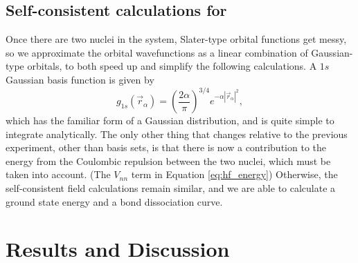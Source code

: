 \documentclass[journal=jacsat,manuscript=communication]{achemso}
\begin{document}
\subsection{Self-consistent calculations for }
Once there are two nuclei in the system, Slater-type orbital functions get messy, so we approximate the orbital wavefunctions as a linear combination of Gaussian-type orbitals, to both speed up and simplify the following calculations.  A $1s$ Gaussian basis function is given by
\begin{equation}
	g_{1s}(\vec{r}_\alpha)=\left(\frac{2\alpha}{\pi}\right)^{3/4}e^{-\alpha|\vec{r}_\alpha|^2},
\end{equation}
which has the familiar form of a Gaussian distribution, and is quite simple to integrate analytically.  The only other thing that changes relative to the previous experiment, other than basis sets, is that there is now a contribution to the energy from the Coulombic repulsion between the two nuclei, which must be taken into account. (The $V_{nn}$ term in Equation \ref{eq:hf_energy})  Otherwise, the self-consistent field calculations remain similar, and we are able to calculate a ground state energy and a bond dissociation curve.
\section{Results and Discussion}
\end{document}
